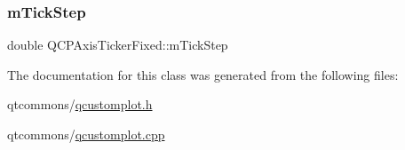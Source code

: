 \mbox{\label{class_q_c_p_axis_ticker_fixed_a4aeef2d3eaa57ec56f422ab1f82175d2}} 
\subsubsection{\texorpdfstring{mTickStep}{mTickStep}}
{\footnotesize\ttfamily double Q\+C\+P\+Axis\+Ticker\+Fixed\+::m\+Tick\+Step\hspace{0.3cm}{\ttfamily [protected]}}



The documentation for this class was generated from the following files\+:\begin{DoxyCompactItemize}
\item 
qtcommons/\mbox{\hyperlink{qcustomplot_8h}{qcustomplot.\+h}}\item 
qtcommons/\mbox{\hyperlink{qcustomplot_8cpp}{qcustomplot.\+cpp}}\end{DoxyCompactItemize}
